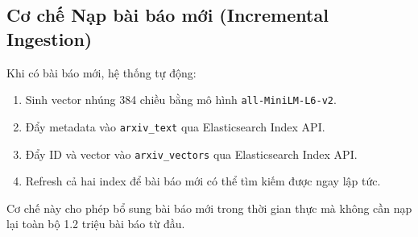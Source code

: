 \subsection{Cơ chế Nạp bài báo mới (Incremental Ingestion)}
Khi có bài báo mới, hệ thống tự động:
\begin{enumerate}
    \item Sinh vector nhúng 384 chiều bằng mô hình \texttt{all-MiniLM-L6-v2}.
    \item Đẩy metadata vào \texttt{arxiv\_text} qua Elasticsearch Index API.
    \item Đẩy ID và vector vào \texttt{arxiv\_vectors} qua Elasticsearch Index API.
    \item Refresh cả hai index để bài báo mới có thể tìm kiếm được ngay lập tức.
\end{enumerate}

Cơ chế này cho phép bổ sung bài báo mới trong thời gian thực mà không cần nạp lại toàn bộ 1.2 triệu bài báo từ đầu.